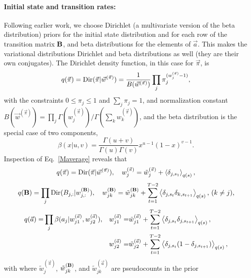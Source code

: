 \paragraph{Initial state and transition rates:}
Following earlier
work\cite{Mackay1997,Beal2003,Bronson2009,Persson2013}, we choose
Dirichlet (a multivariate version of the beta
distribution\cite{wiki:dirichlet}) priors for the initial state
distribution and for each row of the transition matrix $\mathbf{B}$,
and beta distributions for the elements of $\vec a$. This makes the
variational distributions Dirichlet and beta distributions as well
(they are their own conjugates). The Dirichlet density function, in
this case for $\vec\pi$, is
\begin{equation}\label{eq:p0pi}
        q(\vec\pi)=\text{Dir}(\vec\pi|\vec{w}^{(\vec{\pi})})=\frac{1}{B(\vec
        w^{(\vec\pi)})}\prod_j \pi_j^{(w_j^{(\vec\pi)}-1)},
\end{equation}
with the constraints $0\le \pi_j\le1$ and $\sum_j\pi_j=1$, and
normalization constant $B(\vec
w^{(\vec\pi)})=\prod_j\Gamma(w_j^{(\vec\pi)})/\Gamma(\sum_kw_k^{(\vec\pi)})$\cite{wiki:dirichlet},
and the beta distribution is the special case of two components,
\begin{equation}
\beta(x|u,v)=\frac{\Gamma(u+v)}{\Gamma(u)\Gamma(v)}x^{u-1}(1-x)^{v-1}.
\end{equation}
Inspection of Eq.~\eqref{Maverage} reveals that
\begin{equation}\label{VBM_pi}
  q(\vec{\pi})=\text{Dir}(\vec{\pi}|\vec{w}^{(\vec{\pi})}),\quad
w_j^{(\vec{\pi})}=\tilde
w_j^{(\vec{\pi})}+\left\langle \delta_{j,s_1}\right\rangle_{q(s)},
\end{equation}
\begin{equation}\label{VBM_B}
  q(\mathbf{B})=\prod_j
  \text{Dir}(B_{j,:}|w_{j,:}^{(\mathbf{B})}),\quad
w_{jk}^{(\mathbf{B})}=\tilde w_{jk}^{(\mathbf{B})}
  +\sum_{t=1}^{T-2}\left\langle \delta_{j,s_t}\delta_{k,s_{t+1}}\right\rangle_{q(s)}\text{, ($k\ne j$),}
\end{equation}
\begin{align}
  q(\vec{a})=&\prod_j \beta(a_j|w_{j1}^{(\vec{a})},w_{j2}^{(\vec{a})}),&
  w_{j1}^{(\vec{a})}=&\tilde w_{j1}^{(\vec{a})}
  +\sum_{t=1}^{T-2}\left\langle \delta_{j,s_t}\delta_{j,s_{t+1}}\right\rangle_{q(s)},\nonumber\\
  &&  
w_{j2}^{(\vec{a})}=&\tilde w_{j2}^{(\vec{a})}
  +\sum_{t=1}^{T-2}\left\langle \delta_{j,s_t}(1-\delta_{j,s_{t+1}})\right\rangle_{q(s)},
\label{VBM_a}
\end{align}
with where $\tilde w_j^{(\vec{\pi})}$, $\tilde w_{jk}^{(\mathbf{B})}$,
and $\tilde w_{jk}^{(\vec{a})}$ are pseudocounts in the prior
